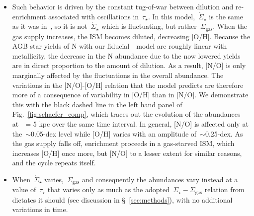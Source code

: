 \documentclass[ms.tex]{subfiles}
\begin{document}
\begin{itemize}
	\item Such behavior is driven by the constant tug-of-war between dilution 
	and re-enrichment associated with oscillations in~$\tau_\star$. 
	In this model,~$\dot{\Sigma}_\star$ is the same as it was 
	in~\citet{Johnson2021}, so it is not~$\dot{\Sigma}_\star$ which is 
	fluctuating, but rather~$\Sigma_\text{gas}$. 
	When the gas supply increases, the ISM becomes diluted, decreasing [O/H]. 
	Because the AGB star yields of N with our fiducial~\cristallo~model are 
	roughly linear with metallicity, the decrease in the N abundance due to the 
	now lowered yields are in direct proportion to the amount of dilution. 
	As a result, [N/O] is only marginally affected by the fluctuations in the 
	overall abundance. 
	The variations in the [N/O]-[O/H] relation that the model predicts are 
	therefore more of a consequence of variability in [O/H] than in [N/O]. 
	We demonstrate this with the black dashed line in the left hand panel of 
	Fig.~\ref{fig:schaefer_comp}, which traces out the evolution of the 
	abundances at~\rgal~= 5 kpc over the same time interval. 
	In general, [N/O] is affected only at the~$\sim$0.05-dex level while 
	[O/H] varies with an amplitude of~$\sim$0.25-dex. 
	As the gas supply falls off, enrichment proceeds in a gas-starved ISM, 
	which increases [O/H] once more, but [N/O] to a lesser extent for similar 
	reasons, and the cycle repeats itself. 

	\item When~$\dot{\Sigma}_\star$ varies,~$\Sigma_\text{gas}$ and 
	consequently the abundances vary instead at a value of~$\tau_\star$ that 
	varies only as much as the adopted~$\dot{\Sigma}_\star - \Sigma_\text{gas}$ 
	relation from~\citet{Johnson2021} dictates it should (see discussion in 
	\S~\ref{sec:methods}), with no additional variations in time. 


\end{itemize}
\end{document}
